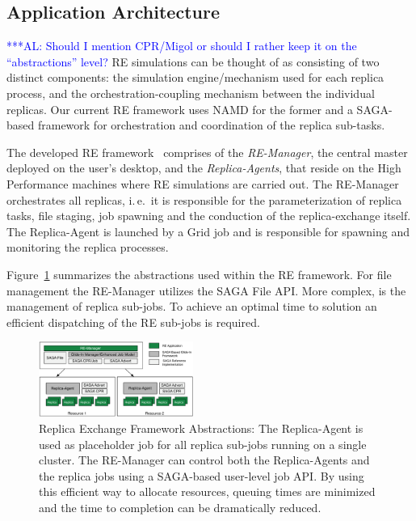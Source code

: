 \documentclass[conference,final]{IEEEtran}
\newcommand{\up}{\vspace*{-1em}}
\newcommand{\alnote}[1]{ {\textcolor{blue} { ***AL: #1 }}}
\newcommand{\alnote}[1]{}
\begin{document}

\up

\subsection{Application Architecture}

\up

\alnote{Should I mention CPR/Migol or should I rather keep it on the
  ``abstractions'' level?} RE simulations can be thought of as
consisting of two distinct components: the simulation engine/mechanism
used for each replica process, and the orchestration-coupling
mechanism between the individual replicas. Our current RE framework
uses NAMD for the former and a SAGA-based framework for orchestration
and coordination of the replica sub-tasks.

The developed RE framework~\cite{Luckow:2008la} comprises of the
\emph{RE-Manager}, the central master deployed on the user's desktop,
and the \textit{Replica-Agents}, that reside on the High Performance
machines where RE simulations are carried out. The RE-Manager
orchestrates all replicas, i.\,e.\ it is responsible for the
parameterization of replica tasks, file staging, job spawning and the
conduction of the replica-exchange itself.  The Replica-Agent is
launched by a Grid job and is responsible for spawning and monitoring
the replica processes.

Figure~\ref{fig:remdmanager_v11} summarizes the abstractions used
within the RE framework.  For file management the RE-Manager utilizes
the SAGA File API. More complex, is the management of replica
sub-jobs. To achieve an optimal time to solution an efficient
dispatching of the RE sub-jobs is required.

\up
\begin{figure}[htbp]
    \centering
        \includegraphics[width=0.45\textwidth]{remdmanager_v11.pdf}
    \caption{Replica Exchange Framework Abstractions:      
          The Replica-Agent is used as placeholder job for
          all replica sub-jobs running on a single cluster. The
          RE-Manager can control both the Replica-Agents and the replica
          jobs using a SAGA-based user-level job API. By using this
          efficient way to allocate resources, queuing times are minimized
          and the time to completion can be dramatically reduced. \up}
    \label{fig:remdmanager_v11}
\end{figure}  
\end{document}
